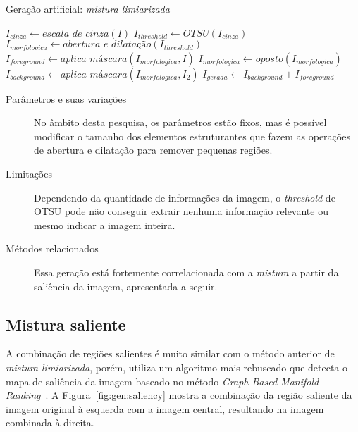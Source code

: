 \begin{algorithm}[!htbp]
  \caption{Geração artificial: \emph{mistura limiarizada}}
  \label{alg:threshold}
  \SetAlgoLined

  $I_{cinza} \gets \textit{escala de cinza}(I)$\;
  $I_{threshold} \gets OTSU(I_{cinza})$\;
  $I_{morfologica} \gets \textit{abertura e dilatação} (I_{threshold})$\;
  $I_{foreground} \gets \textit{aplica máscara}(I_{morfologica}, I) $\;
  $I_{morfologica} \gets \textit{oposto}(I_{morfologica})$\;
  $I_{background} \gets \textit{aplica máscara}(I_{morfologica}, I_2) $\;
  $I_{gerada} \gets I_{background} + I_{foreground}$\;
\end{algorithm}

\begin{description}
  \item[Parâmetros e suas variações] No âmbito desta pesquisa, os parâmetros estão fixos, mas é possível modificar o tamanho dos elementos estruturantes que fazem as operações de abertura e dilatação para remover pequenas regiões.

  \item[Limitações] Dependendo da quantidade de informações da imagem, o \textit{threshold} de OTSU pode não conseguir extrair nenhuma informação relevante ou mesmo indicar a imagem inteira.

  \item[Métodos relacionados] Essa geração está fortemente correlacionada com a \emph{mistura} a partir da saliência da imagem, apresentada a seguir.
\end{description}
\FloatBarrier
\subsection{Mistura saliente}

A combinação de regiões salientes é muito similar com o método anterior de \emph{mistura limiarizada}, porém, utiliza um algoritmo mais rebuscado que detecta o mapa de saliência da imagem baseado no método \textit{Graph-Based Manifold Ranking}~\cite{Yang2013}. A Figura~\ref{fig:gen:saliency} mostra a combinação da região saliente da imagem original à esquerda com a imagem central, resultando na imagem combinada à direita.

